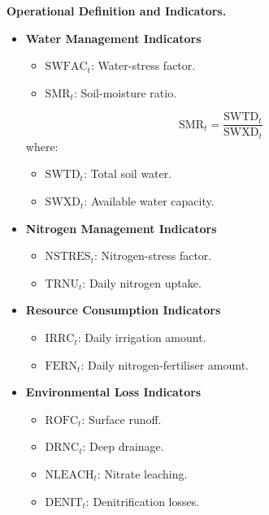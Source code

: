 \vspace{0.2cm}
\noindent\textbf{Operational Definition and Indicators.}
\begin{itemize}
  \item \textbf{Water Management Indicators}
  \begin{itemize}
      \item $\mathrm{SWFAC}_t$: Water-stress factor.
      \item $\mathrm{SMR}_t$: Soil-moisture ratio.
  \end{itemize}
  \begin{equation}
  \mathrm{SMR}_t=\frac{\mathrm{SWTD}_t}{\mathrm{SWXD}_t}
  \end{equation}
  where:
  \begin{itemize}
      \item $\mathrm{SWTD}_t$: Total soil water.
      \item $\mathrm{SWXD}_t$: Available water capacity.
  \end{itemize}

  \item \textbf{Nitrogen Management Indicators}
  \begin{itemize}
      \item $\mathrm{NSTRES}_t$: Nitrogen-stress factor.
      \item $\mathrm{TRNU}_t$: Daily nitrogen uptake.
  \end{itemize}

  \item \textbf{Resource Consumption Indicators}
  \begin{itemize}
      \item $\mathrm{IRRC}_t$: Daily irrigation amount.
      \item $\mathrm{FERN}_t$: Daily nitrogen-fertiliser amount.
  \end{itemize}

  \item \textbf{Environmental Loss Indicators}
  \begin{itemize}
      \item $\mathrm{ROFC}_t$: Surface runoff.
      \item $\mathrm{DRNC}_t$: Deep drainage.
      \item $\mathrm{NLEACH}_t$: Nitrate leaching.
      \item $\mathrm{DENIT}_t$: Denitrification losses.
  \end{itemize}
\end{itemize}

